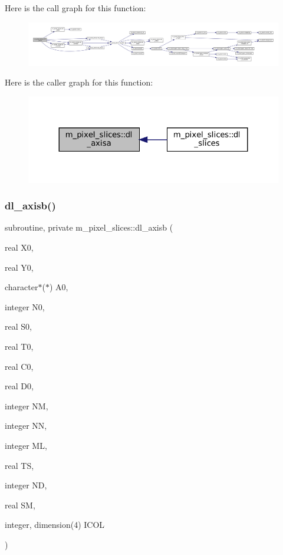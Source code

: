 Here is the call graph for this function\+:\nopagebreak
\begin{figure}[H]
\begin{center}
\leavevmode
\includegraphics[width=350pt]{namespacem__pixel__slices_afcc122fe448b5f806c0a372a203cd9ea_cgraph}
\end{center}
\end{figure}
Here is the caller graph for this function\+:\nopagebreak
\begin{figure}[H]
\begin{center}
\leavevmode
\includegraphics[width=324pt]{namespacem__pixel__slices_afcc122fe448b5f806c0a372a203cd9ea_icgraph}
\end{center}
\end{figure}
\mbox{\label{namespacem__pixel__slices_ab70907b4409a4346c450488b5bcb34a8}} 
\subsubsection{\texorpdfstring{dl\+\_\+axisb()}{dl\_axisb()}}
{\footnotesize\ttfamily subroutine, private m\+\_\+pixel\+\_\+slices\+::dl\+\_\+axisb (\begin{DoxyParamCaption}\item[{real}]{X0,  }\item[{real}]{Y0,  }\item[{character$\ast$($\ast$)}]{A0,  }\item[{integer}]{N0,  }\item[{real}]{S0,  }\item[{real}]{T0,  }\item[{real}]{C0,  }\item[{real}]{D0,  }\item[{integer}]{NM,  }\item[{integer}]{NN,  }\item[{integer}]{ML,  }\item[{real}]{TS,  }\item[{integer}]{ND,  }\item[{real}]{SM,  }\item[{integer, dimension(4)}]{I\+C\+OL }\end{DoxyParamCaption})\hspace{0.3cm}{\ttfamily [private]}}



